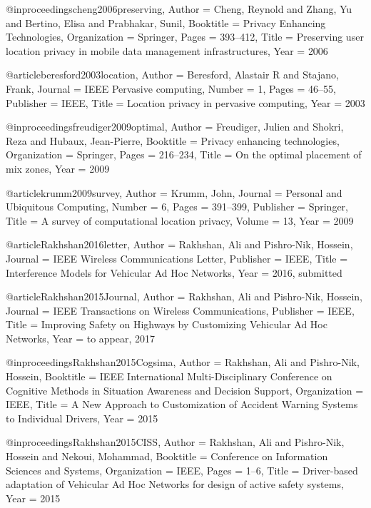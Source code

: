 {{{{{	@inproceedings{cheng2006preserving,
	Author = {Cheng, Reynold and Zhang, Yu and Bertino, Elisa and Prabhakar, Sunil},
	Booktitle = {Privacy Enhancing Technologies},
	Organization = {Springer},
	Pages = {393--412},
	Title = {Preserving user location privacy in mobile data management infrastructures},
	Year = {2006}}
	
	@article{beresford2003location,
	Author = {Beresford, Alastair R and Stajano, Frank},
	Journal = {IEEE Pervasive computing},
	Number = {1},
	Pages = {46--55},
	Publisher = {IEEE},
	Title = {Location privacy in pervasive computing},
	Year = {2003}}
	
	@inproceedings{freudiger2009optimal,
	Author = {Freudiger, Julien and Shokri, Reza and Hubaux, Jean-Pierre},
	Booktitle = {Privacy enhancing technologies},
	Organization = {Springer},
	Pages = {216--234},
	Title = {On the optimal placement of mix zones},
	Year = {2009}}
	
	@article{krumm2009survey,
	Author = {Krumm, John},
	Journal = {Personal and Ubiquitous Computing},
	Number = {6},
	Pages = {391--399},
	Publisher = {Springer},
	Title = {A survey of computational location privacy},
	Volume = {13},
	Year = {2009}}
	
	@article{Rakhshan2016letter,
	Author = {Rakhshan, Ali and Pishro-Nik, Hossein},
	Journal = {IEEE Wireless Communications Letter},
	Publisher = {IEEE},
	Title = {Interference Models for Vehicular Ad Hoc Networks},
	Year = {2016, submitted}}
	
	@article{Rakhshan2015Journal,
	Author = {Rakhshan, Ali and Pishro-Nik, Hossein},
	Journal = {IEEE Transactions on Wireless Communications},
	Publisher = {IEEE},
	Title = {Improving Safety on Highways by Customizing Vehicular Ad Hoc Networks},
	Year = {to appear, 2017}}
	
	@inproceedings{Rakhshan2015Cogsima,
	Author = {Rakhshan, Ali and Pishro-Nik, Hossein},
	Booktitle = {IEEE International Multi-Disciplinary Conference on Cognitive Methods in Situation Awareness and Decision Support},
	Organization = {IEEE},
	Title = {A New Approach to Customization of Accident Warning Systems to Individual Drivers},
	Year = {2015}}
	
	@inproceedings{Rakhshan2015CISS,
	Author = {Rakhshan, Ali and Pishro-Nik, Hossein and Nekoui, Mohammad},
	Booktitle = {Conference on Information Sciences and Systems},
	Organization = {IEEE},
	Pages = {1--6},
	Title = {Driver-based adaptation of Vehicular Ad Hoc Networks for design of active safety systems},
	Year = {2015}}
	
}}}}}
